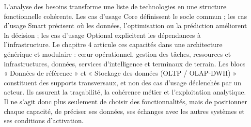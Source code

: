L’analyse des besoins transforme une liste de technologies en une structure fonctionnelle cohérente. Les cas d’usage Core définissent le socle commun ; les cas d’usage Smart précisent où les données, l’optimisation ou la prédiction améliorent la décision ; les cas d’usage Optional explicitent les dépendances à l’infrastructure. Le chapitre 4 articule ces capacités dans une architecture générique et modulaire : cœur opérationnel, gestion des tâches, ressources et infrastructures, données, services d’intelligence et terminaux de terrain. Les blocs « Données de référence » et « Stockage des données (OLTP / OLAP-DWH) » constituent des supports transversaux, et non des cas d’usage déclenchés par un acteur. Ils assurent la traçabilité, la cohérence métier et l’exploitation analytique. Il ne s’agit donc plus seulement de choisir des fonctionnalités, mais de positionner chaque capacité, de préciser ses données, ses échanges avec les autres systèmes et ses conditions d’activation.

